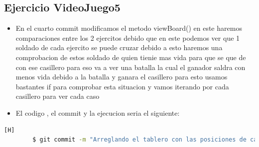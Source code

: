 \documentclass{article}
\begin{document}
	\subsection{Ejercicio VideoJuego5}
	\begin{itemize}	
		\item En el cuarto commit modificamos el metodo viewBoard() en este haremos comparaciones entre los 2 ejercitos debido que en este podemos ver que 1 soldado de cada ejercito se puede cruzar debido a esto haremos una comprobacion de estos soldado de quien tienie mas vida para que se que de con ese casillero para eso va a ver una batalla la cual el ganador saldra con menos vida debido a la batalla y ganara el casillero para esto usamos bastantes if para comprobar esta situacion y vamos iterando por cada casillero para ver cada caso
		\item El codigo , el commit y la ejecucion seria el siguiente:
	\end{itemize}	
	\begin{lstlisting}[language=bash,caption={Commit}][H]
		$ git commit -m "Arreglando el tablero con las posiciones de cada bando de cada ejercito en caso de que soldados de diferente ejercito se encuentren en el mismo casillero estos van a tener una batalla como vemos en la que se compara su nivel de vida y el que tenga mas vida se posicionara donde esta siendo este el ganador pero su vida se reducira debido laa batalla tenida con el otro soldado el cual va a ser eliminado del campo"
	\end{lstlisting}	
\end{document}
